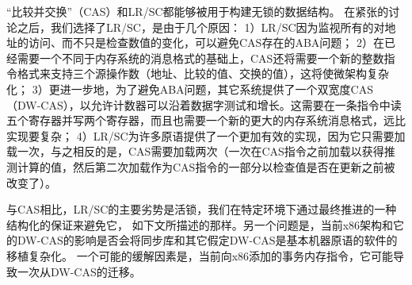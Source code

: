 \begin{commentary}
  “比较并交换”（CAS）和LR/SC都能够被用于构建无锁的数据结构。
  在紧张的讨论之后，我们选择了LR/SC，是由于几个原因：
  1）LR/SC因为监视所有的对地址的访问、而不只是检查数值的变化，可以避免CAS存在的ABA问题；
  2）在已经需要一个不同于内存系统的消息格式的基础上，CAS还将需要一个新的整数指令格式来支持三个源操作数（地址、比较的值、交换的值），这将使微架构复杂化；
  3）更进一步地，为了避免ABA问题，其它系统提供了一个双宽度CAS（DW-CAS），以允许计数器可以沿着数据字测试和增长。这需要在一条指令中读五个寄存器并写两个寄存器，而且也需要一个新的更大的内存系统消息格式，远比实现要复杂；
  4）LR/SC为许多原语提供了一个更加有效的实现，因为它只需要加载一次，与之相反的是，CAS需要加载两次（一次在CAS指令之前加载以获得推测计算的值，然后第二次加载作为CAS指令的一部分以检查值是否在更新之前被改变了）。

与CAS相比，LR/SC的主要劣势是活锁，我们在特定环境下通过最终推进的一种结构化的保证来避免它，
如下文所描述的那样。另一个问题是，当前x86架构和它的DW-CAS的影响是否会将同步库和其它假定DW-CAS是基本机器原语的软件的移植复杂化。
一个可能的缓解因素是，当前向x86添加的事务内存指令，它可能导致一次从DW-CAS的迁移。


\end{commentary}
